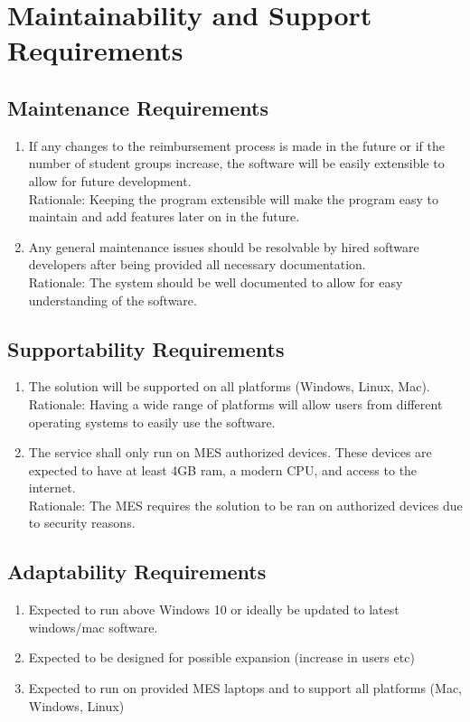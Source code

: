 \documentclass[12pt]{article}
\begin{document}
\section{Maintainability and Support Requirements}
\subsection{Maintenance Requirements}

\begin{enumerate}
  
  \item If any changes to the reimbursement process is made in the future or if the number of student groups increase, the software will be easily extensible to allow for future development. \\
  Rationale: Keeping the program extensible will make the program easy to maintain and add features later on in the future.
  \item Any general maintenance issues should be resolvable by hired software developers after being provided all necessary documentation. \\
  Rationale: The system should be well documented to allow for easy understanding of the software.
\end{enumerate}
\subsection{Supportability Requirements}

\begin{enumerate}
  
  \item The solution will be supported on all platforms (Windows, Linux, Mac). \\
  Rationale: Having a wide range of platforms will allow users from different operating systems to easily use the software.
  \item The service shall only run on MES authorized devices. These devices are expected to have at least 4GB ram, a modern CPU, and access to the internet. \\
  Rationale: The MES requires the solution to be ran on authorized devices due to security reasons.
\end{enumerate}
\subsection{Adaptability Requirements}
\begin{enumerate}
  
  \item Expected to run above Windows 10 or ideally be updated to latest windows/mac software. \\
  \item Expected to be designed for possible expansion (increase in users etc) \\
  \item Expected to run on provided MES laptops and to support all platforms (Mac, Windows, Linux)
\end{enumerate}
\end{document}
